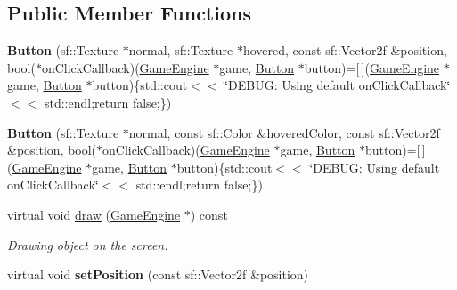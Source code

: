 \subsection*{Public Member Functions}
\begin{DoxyCompactItemize}
\item 
\mbox{\label{class_button_ad1a553528260f66367628724384cdfd0}} 
{\bfseries Button} (sf\+::\+Texture $\ast$normal, sf\+::\+Texture $\ast$hovered, const sf\+::\+Vector2f \&position, bool($\ast$on\+Click\+Callback)(\mbox{\hyperlink{class_game_engine}{Game\+Engine}} $\ast$game, \mbox{\hyperlink{class_button}{Button}} $\ast$button)=\mbox{[}$\,$\mbox{]}(\mbox{\hyperlink{class_game_engine}{Game\+Engine}} $\ast$game, \mbox{\hyperlink{class_button}{Button}} $\ast$button)\{std\+::cout$<$$<$ \char`\"{}D\+E\+B\+U\+G\+: Using default on\+Click\+Callback\char`\"{}$<$$<$ std\+::endl;return false;\})
\item 
\mbox{\label{class_button_ad1756d01fbebe40e07b45fd1963c33d8}} 
{\bfseries Button} (sf\+::\+Texture $\ast$normal, const sf\+::\+Color \&hovered\+Color, const sf\+::\+Vector2f \&position, bool($\ast$on\+Click\+Callback)(\mbox{\hyperlink{class_game_engine}{Game\+Engine}} $\ast$game, \mbox{\hyperlink{class_button}{Button}} $\ast$button)=\mbox{[}$\,$\mbox{]}(\mbox{\hyperlink{class_game_engine}{Game\+Engine}} $\ast$game, \mbox{\hyperlink{class_button}{Button}} $\ast$button)\{std\+::cout$<$$<$ \char`\"{}D\+E\+B\+U\+G\+: Using default on\+Click\+Callback\char`\"{}$<$$<$ std\+::endl;return false;\})
\item 
\mbox{\label{class_button_a99e75218b31357786cff815f87f1a093}} 
virtual void \mbox{\hyperlink{class_button_a99e75218b31357786cff815f87f1a093}{draw}} (\mbox{\hyperlink{class_game_engine}{Game\+Engine}} $\ast$) const
\begin{DoxyCompactList}\small\item\em Drawing object on the screen. \end{DoxyCompactList}\item 
\mbox{\label{class_button_a95a9aafc24ed5d95d3557f7155832433}} 
virtual void {\bfseries set\+Position} (const sf\+::\+Vector2f \&position)
\item 
\mbox{\label{class_button_a01ff4aace35c7d0c4d8b35eda290378f}} 

\end{DoxyCompactItemize}
